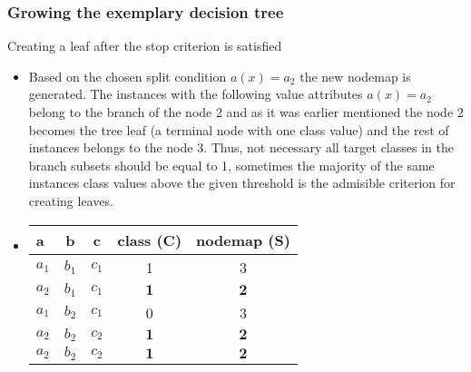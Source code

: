 \documentclass[smaller, proffesionalfonts]{beamer}
\def\bm{\boldsymbol}
\begin{document}
\begin{frame}
\frametitle{Growing the exemplary decision tree}
\begin{block}{Creating a leaf after the stop criterion is satisfied}
\begin{itemize}
\item
\justifying
Based on the chosen split condition $a(x)=a_2$ the new nodemap is generated. The instances with the following value attributes $a(x)=a_2$ belong to the branch of the node 2 and as it was earlier mentioned the node 2 becomes the tree leaf (a terminal node with one class value) and the rest of instances belongs to the node 3. Thus, not necessary all target classes in the branch subsets should be equal to 1, sometimes the majority of the same instances class values above the given threshold is the admisible criterion for creating leaves. 
\item
\begin{center}
{\sf
   \begin{tabular}{|p{3mm}||c|c||c||c|}
   \hline 
   a & b & c & class (C) & nodemap (S)\\
   \hline
   \hline
    $a_1$ & $b_1$ & $c_1$ & 1 & 3 \\
   \hline
    $a_2$ & $b_1$ & $c_1$ & $\bm 1$ & $\bm 2$ \\
   \hline
    $a_1$ & $b_2$ & $c_1$ & 0 & 3 \\
   \hline
    $a_2$ & $b_2$ & $c_2$ & $\bm 1$ & $\bm 2$ \\
   \hline
    $a_2$ & $b_2$ & $c_2$ & $\bm 1$ & $\bm 2$ \\
   \hline
   \end{tabular}
}
\end{center}
\end{itemize}
\end{block}
\end{frame}
\end{document}
